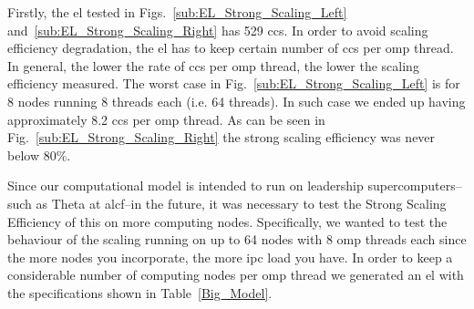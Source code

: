 \documentclass[10pt,journal,compsoc]{IEEEtran}
\begin{document}
Firstly, the \gls{el} tested in Figs.~\ref{sub:EL_Strong_Scaling_Left} and~\ref{sub:EL_Strong_Scaling_Right} has 529 \glspl{cc}. In order to avoid scaling efficiency degradation, the \gls{el} has to keep certain number of \glspl{cc} per \gls{omp} thread. In general, the lower the rate of \glspl{cc} per \gls{omp} thread, the lower the scaling efficiency measured. The worst case in Fig.~\ref{sub:EL_Strong_Scaling_Left} is for 8 nodes running 8 threads each (i.e. 64 threads). In such case we ended up having approximately 8.2 \glspl{cc} per \gls{omp} thread. As can be seen in Fig.~\ref{sub:EL_Strong_Scaling_Right} the strong scaling efficiency was never below 80\%. 

Since our computational model is intended to run on leadership supercomputers--such as Theta at \gls{alcf}--in the future, it was necessary to test the Strong Scaling Efficiency of this on more computing nodes. Specifically, we wanted to test the behaviour of the scaling running on up to 64 nodes with 8 \gls{omp} threads each since the more nodes you incorporate, the more \gls{ipc} load you have. In order to keep a considerable number of computing nodes per \gls{omp} thread we generated an \gls{el} with the specifications shown in Table~\ref{Big_Model}. 
\end{document}
